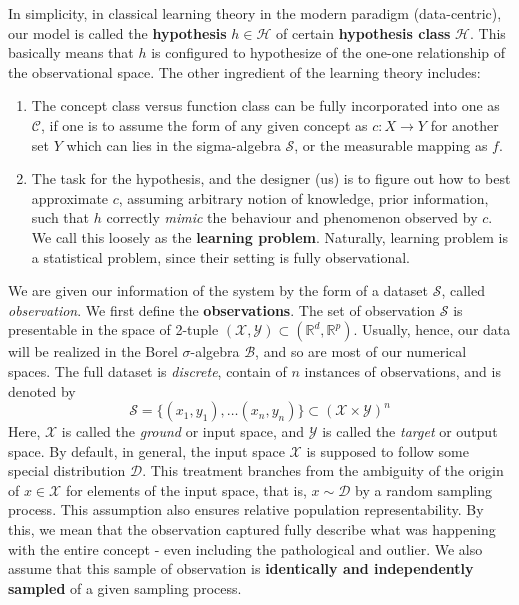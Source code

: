 In simplicity, in classical learning theory in the modern paradigm (data-centric), our model is called the \textbf{hypothesis} $h\in \mathcal{H}$ of certain \textbf{hypothesis class} $\mathcal{H}$. This basically means that $h$ is configured to hypothesize of the one-one relationship of the observational space. The other ingredient of the learning theory includes: 
\begin{enumerate}[itemsep=1pt,topsep=1pt]
    \item The concept class versus function class can be fully incorporated into one as $\mathcal{C}$, if one is to assume the form of any given concept as $c: X\to Y$ for another set $Y$ which can lies in the sigma-algebra $\mathcal{S}$, or the measurable mapping as $f$. 
    \item The task for the hypothesis, and the designer (us) is to figure out how to best approximate $c$, assuming arbitrary notion of knowledge, prior information, such that $h$ correctly \textit{mimic} the behaviour and phenomenon observed by $c$. We call this loosely as the \textbf{learning problem}. Naturally, learning problem is a statistical problem, since their setting is fully observational. 
\end{enumerate}

We are given our information of the system by the form of a dataset $\mathcal{S}$, called \textit{observation}. We first define the \textbf{observations}. The set of observation $\mathcal{S}$ is presentable in the space of 2-tuple $(\mathcal{X},\mathcal{Y})\subset(\mathbb{R}^{d},\mathbb{R}^{p})$. Usually, hence, our data will be realized in the Borel $\sigma$-algebra $\mathcal{B}$, and so are most of our numerical spaces. The full dataset is \textit{discrete}, contain of $n$ instances of observations, and is denoted by 
\begin{equation}
    \mathcal{S} = \{ (x_1,y_1),\dots(x_n,y_n) \} \subset (\mathcal{X}\times \mathcal{Y})^n 
\end{equation}
Here, $\mathcal{X}$ is called the \textit{ground} or input space, and $\mathcal{Y}$ is called the \textit{target} or output space. By default, in general, the input space $\mathcal{X}$ is supposed to follow some special distribution $\mathcal{D}$. This treatment branches from the ambiguity of the origin of $x\in\mathcal{X}$ for elements of the input space, that is, $x\sim \mathcal{D}$ by a random sampling process. This assumption also ensures relative population representability. By this, we mean that the observation captured fully describe what was happening with the entire concept - even including the pathological and outlier. We also assume that this sample of observation is \textbf{identically and independently sampled} of a given sampling process. 

